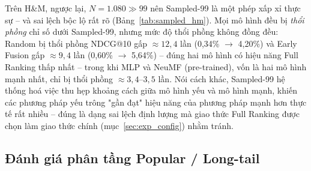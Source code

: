 Trên H\&M, ngược lại, $N=1.080 \gg 99$ nên Sampled-99 là một phép xấp xỉ thực sự -- và sai lệch bộc lộ rất rõ (Bảng~\ref{tab:sampled_hm}). Mọi mô hình đều bị \emph{thổi phồng} chỉ số dưới Sampled-99, nhưng mức độ thổi phồng không đồng đều: Random bị thổi phồng NDCG@10 gấp $\approx 12,4$ lần (0,34\% $\to$ 4,20\%) và Early Fusion gấp $\approx 9,4$ lần (0,60\% $\to$ 5,64\%) -- đúng hai mô hình có hiệu năng Full Ranking thấp nhất -- trong khi MLP và NeuMF (pre-trained), vốn là hai mô hình mạnh nhất, chỉ bị thổi phồng $\approx 3,4$--$3,5$ lần. Nói cách khác, Sampled-99 hệ thống hoá việc thu hẹp khoảng cách giữa mô hình yếu và mô hình mạnh, khiến các phương pháp yếu trông "gần đạt" hiệu năng của phương pháp mạnh hơn thực tế rất nhiều -- đúng là dạng sai lệch định lượng mà giao thức Full Ranking được chọn làm giao thức chính (mục~\ref{sec:exp_config}) nhằm tránh.

\begin{table}[htbp]
    \centering
    \caption{Đối chiếu NDCG@10: Full Ranking và Sampled-99 trên H\&M, cùng hệ số thổi phồng}
    \label{tab:sampled_hm}
\end{table}

\subsection{Đánh giá phân tầng Popular / Long-tail}
\label{subsec:longtail_results}

